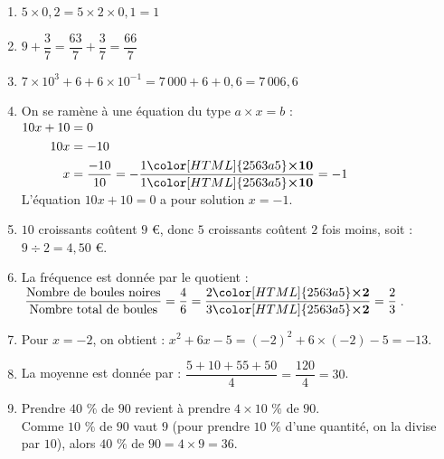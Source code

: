 \documentclass[a4paper,11pt,landscape,exos]{nsi} %
\begin{document}
\begin{multicols}{2}
    \maketitle
\begin{enumerate}[itemsep=.75em]
    \item $5 \times 0{,}2=5\times 2\times 0,1=1$
\item $9+\dfrac{3}{7}= \dfrac{63}{7}+\dfrac{3}{7}=\dfrac{66}{7}$
\item $7\times10^3+6+6\times 10^{-1}=7\,000+6+0{,}6=7\,006{,}6$
\item On se ramène à une équation du type $a\times x=b$ :\\
          $\begin{aligned}
          10x+10&=0\\
         10x&=-10\\
                              x&=\dfrac{-10}{10}=-\dfrac{1{\color[HTML]{2563a5}\boldsymbol{\times10}} }{1{\color[HTML]{2563a5}\boldsymbol{\times10}}}=-1
         \end{aligned}$\\
          
        
          
          L'équation $10x+10=0$ a pour solution $x=-1$.
\item $10$ croissants coûtent  $9$ €, donc
                       $5$ croissants coûtent $2$ fois moins, soit : \\
                       $9\div 2=4{,}50$ €.
\item La fréquence est donnée par le quotient : $\dfrac{\text{Nombre de boules noires}}{\text{Nombre total de boules}}=\dfrac{4}{6}=\dfrac{2{\color[HTML]{2563a5}\boldsymbol{\times2}} }{3{\color[HTML]{2563a5}\boldsymbol{\times2}}}=\dfrac{2}{3}$.
\item 
            Pour $x=-2$, on obtient : $x^2+6x-5=(-2)^2+6\times (-2)-5=-13$.
                      
\item La moyenne est donnée par : $\dfrac{5+10+55+50}{4}=\dfrac{120}{4}=30$.
\item           Prendre $40$ $\%$  de $90$ revient à prendre $4\times 10$ $\%$  de $90$.\\
            Comme $10$ $\%$  de $90$ vaut $9$ (pour prendre $10$ $\%$  d'une quantité, on la divise par $10$), alors
            $40$ $\%$ de $90=4\times 9=36$.
           

\end{enumerate}
\end{multicols}
\end{document}
